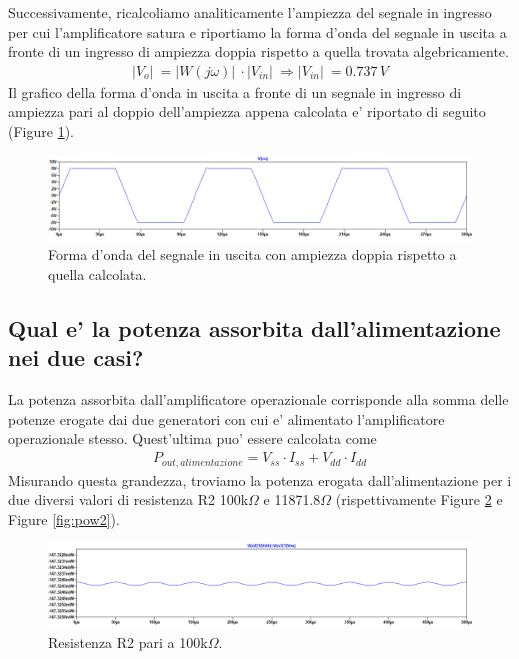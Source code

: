 \documentclass[a4paper,10pt]{article}
\begin{document}
Successivamente, ricalcoliamo analiticamente l'ampiezza del segnale in ingresso per cui l'amplificatore satura e riportiamo la forma d'onda del segnale in uscita a fronte di un ingresso di ampiezza doppia rispetto a quella trovata algebricamente.
\begin{align*}
\lvert V_o \rvert\ = \lvert W(j\omega) \rvert\ \cdot \lvert V_{in} \rvert\ \Rightarrow \lvert V_{in} \rvert\ = 0.737\,V
\end{align*}
Il grafico della forma d'onda in uscita a fronte di un segnale in ingresso di ampiezza pari al doppio dell'ampiezza appena calcolata e' riportato di seguito (Figure \ref{fig:plottaglior2}).
\begin{figure}[h!]
	\centering
 	\includegraphics[width=1\linewidth]{plot-1-5-sat2.png}
  	\caption{Forma d'onda del segnale in uscita con ampiezza doppia rispetto a quella calcolata.}
  	\label{fig:plottaglior2}
\end{figure}

\newpage

\subsection{Qual e' la potenza assorbita dall'alimentazione nei due casi?}
La potenza assorbita dall'amplificatore operazionale corrisponde alla somma delle potenze erogate dai due generatori con cui e' alimentato l'amplificatore operazionale stesso. Quest'ultima puo' essere calcolata come
\begin{align*}
P_{out, alimentazione} = V_{ss} \cdot I_{ss} + V_{dd} \cdot I_{dd}
\end{align*}
Misurando questa grandezza, troviamo la potenza erogata dall'alimentazione per i due diversi valori di resistenza R2 100k$\Omega$ e 11871.8$\Omega$ (rispettivamente Figure \ref{fig:pow1} e Figure \ref{fig:pow2}).

\begin{figure}[h!]
	\centering
 	\includegraphics[width=1\linewidth]{plot1-6-norm.png}
  	\caption{Resistenza R2 pari a 100k$\Omega$.}
  	\label{fig:pow1}
\end{figure}
\end{document}
